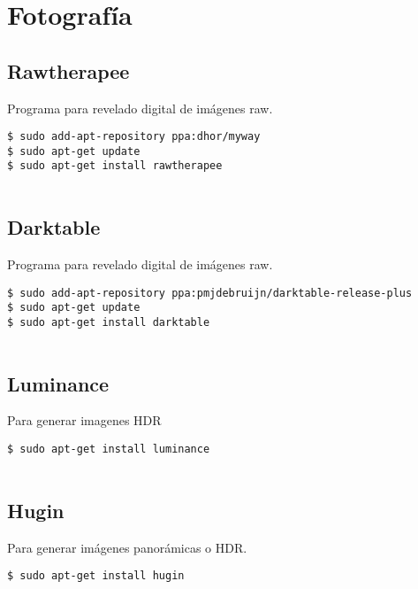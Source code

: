 \section{Fotografía}\label{fotografuxeda}

\subsection{Rawtherapee}\label{rawtherapee}

Programa para revelado digital de imágenes raw.

\begin{verbatim}
$ sudo add-apt-repository ppa:dhor/myway
$ sudo apt-get update
$ sudo apt-get install rawtherapee
      
\end{verbatim}

\subsection{Darktable}\label{darktable}

Programa para revelado digital de imágenes raw.

\begin{verbatim}
$ sudo add-apt-repository ppa:pmjdebruijn/darktable-release-plus
$ sudo apt-get update
$ sudo apt-get install darktable
      
\end{verbatim}

\subsection{Luminance}\label{luminance}

Para generar imagenes HDR

\begin{verbatim}
$ sudo apt-get install luminance
      
\end{verbatim}

\subsection{Hugin}\label{hugin}

Para generar imágenes panorámicas o HDR.

\begin{verbatim}
$ sudo apt-get install hugin
      
\end{verbatim}


